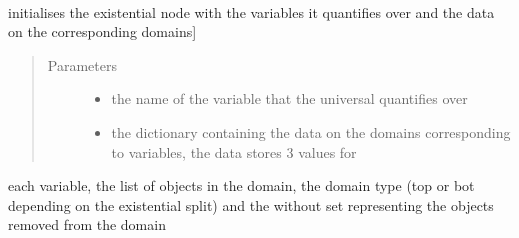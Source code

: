 \documentclass[letterpaper,10pt,english,openany,oneside]{sphinxmanual}
\begin{document}
\begin{fulllineitems}
\label{\detokenize{index:circuit.ExistsNode}}~

\begin{fulllineitems}
\label{\detokenize{index:circuit.ExistsNode.__init__}}
initialises the existential node with the variables it quantifies over and the data on the corresponding domains{]}
\begin{quote}\begin{description}
\item[{Parameters}] \leavevmode\begin{itemize}
\item {} 
 \textendash{} the name of the variable that the universal quantifies over

\item {} 
 \textendash{} the dictionary containing the data on the domains corresponding to variables, the data stores 3 values for

\end{itemize}

\end{description}\end{quote}

each variable, the list of objects in the domain, the domain type (top or bot depending on the existential split) and the without set 
representing the objects removed from the domain

\end{fulllineitems}



\end{fulllineitems}
\end{document}
